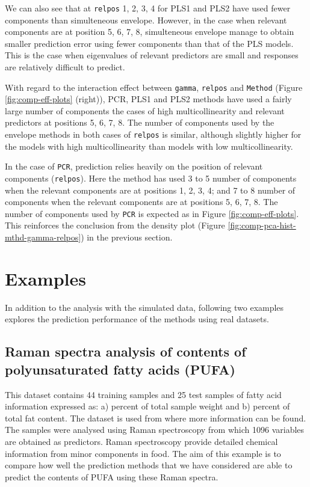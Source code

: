 \documentclass[12pt,3p,authoryear]{elsarticle}
\begin{document}
We can also see that at \texttt{relpos} 1, 2, 3, 4 for PLS1 and PLS2
have used fewer components than simulteneous envelope. However, in the
case when relevant components are at position 5, 6, 7, 8, simulteneous
envelope manage to obtain smaller prediction error using fewer
components than that of the PLS models. This is the case when
eigenvalues of relevant predictors are small and responses are
relatively difficult to predict.

With regard to the interaction effect between \texttt{gamma},
\texttt{relpos} and \texttt{Method} (Figure \ref{fig:comp-eff-plots}
(right)), PCR, PLS1 and PLS2 methods have used a fairly large number of
components the cases of high multicollinearity and relevant predictors
at positions 5, 6, 7, 8. The number of components used by the envelope
methods in both cases of \texttt{relpos} is similar, although slightly
higher for the models with high multicollinearity than models with low
multicollinearity.

In the case of \texttt{PCR}, prediction relies heavily on the position
of relevant components (\texttt{relpos}). Here the method has used 3 to
5 number of components when the relevant components are at positions 1,
2, 3, 4; and 7 to 8 number of components when the relevant components
are at positions 5, 6, 7, 8. The number of components used by
\texttt{PCR} is expected as in Figure \ref{fig:comp-eff-plots}. This
reinforces the conclusion from the density plot (Figure
\ref{fig:comp-pca-hist-mthd-gamma-relpos}) in the previous section.

\section{Examples}\label{examples}

In addition to the analysis with the simulated data, following two
examples explores the prediction performance of the methods using real
datasets.

\subsection{Raman spectra analysis of contents of polyunsaturated fatty
acids
(PUFA)}\label{raman-spectra-analysis-of-contents-of-polyunsaturated-fatty-acids-pufa}

This dataset contains 44 training samples and 25 test samples of fatty
acid information expressed as: a) percent of total sample weight and b)
percent of total fat content. The dataset is used from
\citet{naes2013multi} where more information can be found. The samples
were analysed using Raman spectroscopy from which 1096 variables are
obtained as predictors. Raman spectroscopy provide detailed chemical
information from minor components in food. The aim of this example is to
compare how well the prediction methods that we have considered are able
to predict the contents of PUFA using these Raman spectra.
\end{document}
